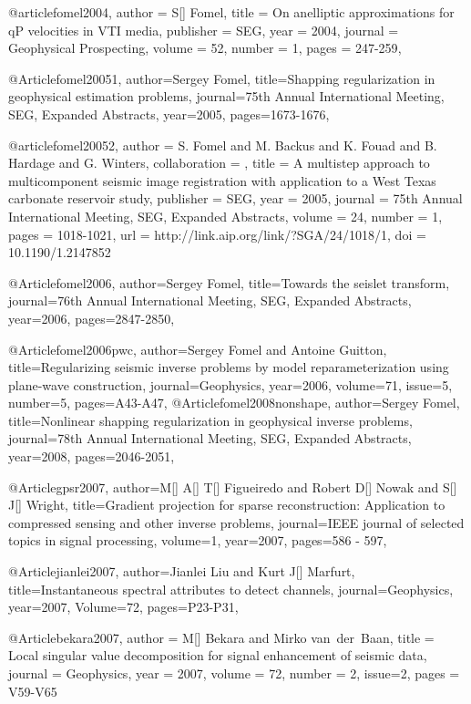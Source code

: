 @article{fomel2004,
  author =	 {S[] Fomel},
  title =	 {On anelliptic approximations for qP velocities in VTI media},
  publisher =	 {SEG},
  year =	 2004,
  journal =	 {Geophysical Prospecting},
  volume =	 52,
  number =	 1,
  pages =	 {247-259},
}

@Article{fomel20051,
  author={Sergey Fomel},
  title={Shapping regularization in geophysical estimation problems},
  journal={75th Annual International Meeting, SEG, Expanded Abstracts},
  year=2005,
  pages={1673-1676},
}

@article{fomel20052,
author = {S. Fomel and M. Backus and K. Fouad and B. Hardage and G. Winters},
collaboration = {},
title = {A multistep approach to multicomponent seismic image
                  registration with application to a {W}est {T}exas
                  carbonate reservoir study},
publisher = {SEG},
year = {2005},
journal = {75th Annual International Meeting, SEG, Expanded Abstracts},
volume = {24},
number = {1},
pages = {1018-1021},
url = {http://link.aip.org/link/?SGA/24/1018/1},
doi = {10.1190/1.2147852}
}

@Article{fomel2006,
  author={Sergey Fomel},
  title={Towards the seislet transform},
  journal={76th Annual International Meeting, SEG, Expanded Abstracts},
  year=2006,
  pages={2847-2850},
}

@Article{fomel2006pwc,
  author={Sergey Fomel and Antoine Guitton},
  title={Regularizing seismic inverse problems by model reparameterization using plane-wave construction},
  journal={Geophysics},
  year=2006,
  volume=71,
  issue=5,
  number=5,
  pages={A43-A47},
}
@Article{fomel2008nonshape,
  author={Sergey Fomel},
  title={Nonlinear shapping regularization in geophysical inverse problems},
  journal={78th Annual International Meeting, SEG, Expanded Abstracts},
  year=2008,
  pages={2046-2051},
}

@Article{gpsr2007,
author={M[] A[] T[] Figueiredo and Robert D[] Nowak and S[] J[] Wright},
title={Gradient projection for sparse reconstruction: Application to compressed sensing and other inverse problems},
journal={IEEE journal of selected topics in signal processing},
volume=1,
year=2007,
pages={586 - 597},
}

@Article{jianlei2007,
  author={Jianlei Liu and Kurt J[] Marfurt},
  title={Instantaneous spectral attributes to detect channels},
  journal={Geophysics},
  year=2007,
  Volume=72,
  pages={P23-P31},
}




@Article{bekara2007,
  author = 	 {M[] Bekara and Mirko van~der~Baan},
  title = 	 {Local singular value decomposition for signal enhancement of seismic data},
  journal = 	 {Geophysics},
  year = 	 2007,
  volume = 	 72,
  number = 	 2,
  issue=2,
  pages = 	 {V59-V65}}

